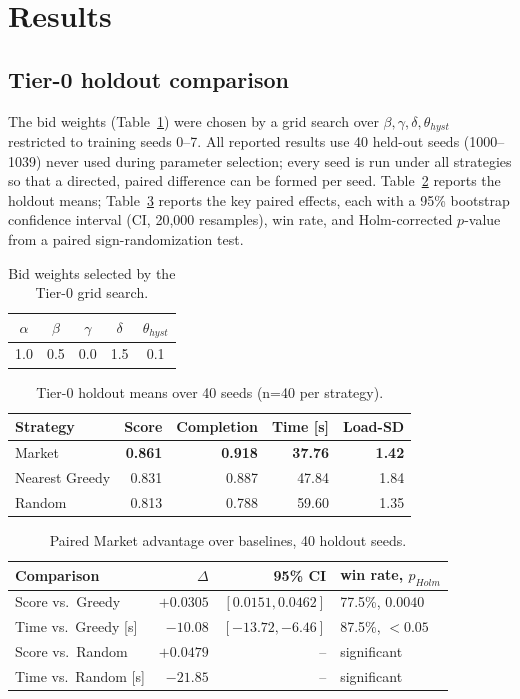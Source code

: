\documentclass[conference]{IEEEtran}
\begin{document}
\section{Results}

\subsection{Tier-0 holdout comparison}

The bid weights (Table~\ref{tab:weights}) were chosen by a grid search over
$\beta,\gamma,\delta,\theta_{hyst}$ restricted to training seeds 0--7. All
reported results use 40 held-out seeds (1000--1039) never used during
parameter selection; every seed is run under all strategies so that a
directed, paired difference can be formed per seed. Table~\ref{tab:tier0}
reports the holdout means; Table~\ref{tab:tier0-effects} reports the
key paired effects, each with a 95\% bootstrap confidence interval (CI,
20{,}000 resamples), win rate, and Holm-corrected $p$-value from a paired
sign-randomization test.

\begin{table}[t]
\centering
\caption{Bid weights selected by the Tier-0 grid search.}
\label{tab:weights}
\begin{tabular}{@{}ccccc@{}}
\toprule
$\alpha$ & $\beta$ & $\gamma$ & $\delta$ & $\theta_{hyst}$\\
\midrule
1.0 & 0.5 & 0.0 & 1.5 & 0.1\\
\bottomrule
\end{tabular}
\end{table}

\begin{table}[t]
\centering
\caption{Tier-0 holdout means over 40 seeds (n=40 per strategy).}
\label{tab:tier0}
\small
\begin{tabular}{@{}lrrrr@{}}
\toprule
Strategy & Score & Completion & Time [s] & Load-SD\\
\midrule
Market & \textbf{0.861} & \textbf{0.918} & \textbf{37.76} & \textbf{1.42}\\
Nearest Greedy & 0.831 & 0.887 & 47.84 & 1.84\\
Random & 0.813 & 0.788 & 59.60 & 1.35\\
\bottomrule
\end{tabular}
\end{table}

\begin{table}[t]
\centering
\caption{Paired Market advantage over baselines, 40 holdout seeds.}
\label{tab:tier0-effects}
\small
\begin{tabular}{@{}lrrl@{}}
\toprule
Comparison & $\Delta$ & 95\% CI & win rate, $p_{Holm}$\\
\midrule
Score vs.\ Greedy & $+0.0305$ & $[0.0151,0.0462]$ & 77.5\%, $0.0040$\\
Time vs.\ Greedy [s] & $-10.08$ & $[-13.72,-6.46]$ & 87.5\%, $<0.05$\\
Score vs.\ Random & $+0.0479$ & -- & significant\\
Time vs.\ Random [s] & $-21.85$ & -- & significant\\
\bottomrule
\end{tabular}
\end{table}
\end{document}
